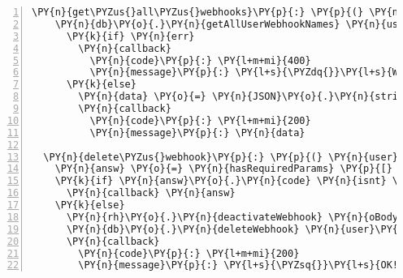 \begin{Verbatim}[fontsize=\scriptsize,commandchars=\\\{\},numbers=left,firstnumber=1,stepnumber=1]
  \PY{n}{get\PYZus{}all\PYZus{}webhooks}\PY{p}{:} \PY{p}{(} \PY{n}{user}\PY{p}{,} \PY{n}{oBody}\PY{p}{,} \PY{n}{callback} \PY{p}{)} \PY{o}{\PYZhy{}}\PY{o}{\PYZgt{}}
    \PY{n}{db}\PY{o}{.}\PY{n}{getAllUserWebhookNames} \PY{n}{user}\PY{o}{.}\PY{n}{username}\PY{p}{,} \PY{p}{(} \PY{n}{err}\PY{p}{,} \PY{n}{data} \PY{p}{)} \PY{o}{\PYZhy{}}\PY{o}{\PYZgt{}}
      \PY{k}{if} \PY{n}{err}
        \PY{n}{callback}
          \PY{n}{code}\PY{p}{:} \PY{l+m+mi}{400}
          \PY{n}{message}\PY{p}{:} \PY{l+s}{\PYZdq{}}\PY{l+s}{We didn}\PY{l+s}{\PYZsq{}}\PY{l+s}{t like your request!}\PY{l+s}{\PYZdq{}}
      \PY{k}{else}
        \PY{n}{data} \PY{o}{=} \PY{n}{JSON}\PY{o}{.}\PY{n}{stringify}\PY{p}{(} \PY{n}{data} \PY{p}{)} \PY{o}{|}\PY{o}{|} \PY{n}{null}
        \PY{n}{callback}
          \PY{n}{code}\PY{p}{:} \PY{l+m+mi}{200}
          \PY{n}{message}\PY{p}{:} \PY{n}{data}

  \PY{n}{delete\PYZus{}webhook}\PY{p}{:} \PY{p}{(} \PY{n}{user}\PY{p}{,} \PY{n}{oBody}\PY{p}{,} \PY{n}{callback} \PY{p}{)} \PY{o}{\PYZhy{}}\PY{o}{\PYZgt{}}
    \PY{n}{answ} \PY{o}{=} \PY{n}{hasRequiredParams} \PY{p}{[} \PY{l+s}{\PYZsq{}}\PY{l+s}{hookid}\PY{l+s}{\PYZsq{}} \PY{p}{]}\PY{p}{,} \PY{n}{oBody}
    \PY{k}{if} \PY{n}{answ}\PY{o}{.}\PY{n}{code} \PY{n}{isnt} \PY{l+m+mi}{200}
      \PY{n}{callback} \PY{n}{answ}
    \PY{k}{else}
      \PY{n}{rh}\PY{o}{.}\PY{n}{deactivateWebhook} \PY{n}{oBody}\PY{o}{.}\PY{n}{hookid}
      \PY{n}{db}\PY{o}{.}\PY{n}{deleteWebhook} \PY{n}{user}\PY{o}{.}\PY{n}{username}\PY{p}{,} \PY{n}{oBody}\PY{o}{.}\PY{n}{hookid}
      \PY{n}{callback}
        \PY{n}{code}\PY{p}{:} \PY{l+m+mi}{200}
        \PY{n}{message}\PY{p}{:} \PY{l+s}{\PYZsq{}}\PY{l+s}{OK!}\PY{l+s}{\PYZsq{}}
\end{Verbatim}













\clearpage
